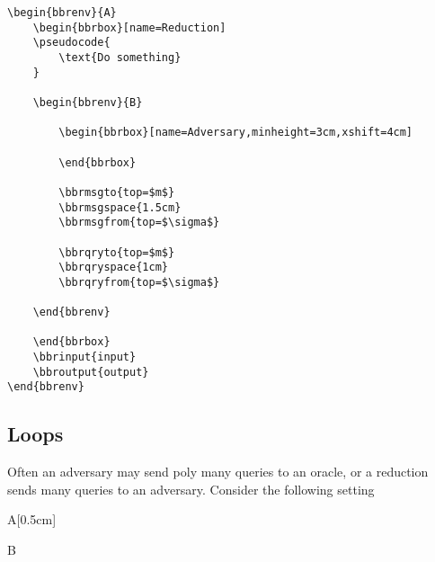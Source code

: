 \documentclass[a4paper]{report}
\begin{document}
\begin{lstlisting}
\begin{bbrenv}{A}
	\begin{bbrbox}[name=Reduction]
	\pseudocode{
		\text{Do something} 
	}

	\begin{bbrenv}{B}

		\begin{bbrbox}[name=Adversary,minheight=3cm,xshift=4cm]

		\end{bbrbox}
		
		\bbrmsgto{top=$m$}
		\bbrmsgspace{1.5cm}
		\bbrmsgfrom{top=$\sigma$}

		\bbrqryto{top=$m$}
		\bbrqryspace{1cm}
		\bbrqryfrom{top=$\sigma$}

	\end{bbrenv}

	\end{bbrbox}
	\bbrinput{input}
	\bbroutput{output}
\end{bbrenv}
\end{lstlisting}


\subsection{Loops}
Often an adversary may send poly many queries to an oracle, or a reduction sends many queries to an adversary.
Consider the following setting

\begin{bbrenv}[1cm]{A}[0.5cm]
	\begin{bbrbox}[name=Reduction]

	\begin{bbrenv}{B}

		\begin{bbrbox}[name=Adversary,minheight=3cm,xshift=4cm]

		\end{bbrbox}
		

	\end{bbrenv}

	\end{bbrbox}
\end{bbrenv}
\end{document}
